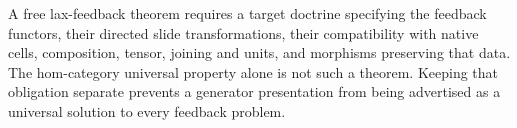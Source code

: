 \documentclass[11pt]{article}
\begin{document}
A free lax-feedback theorem requires a target doctrine specifying the feedback functors, their directed slide transformations, their compatibility with native cells, composition, tensor, joining and units, and morphisms preserving that data. The hom-category universal property alone is not such a theorem. Keeping that obligation separate prevents a generator presentation from being advertised as a universal solution to every feedback problem.
\end{document}
